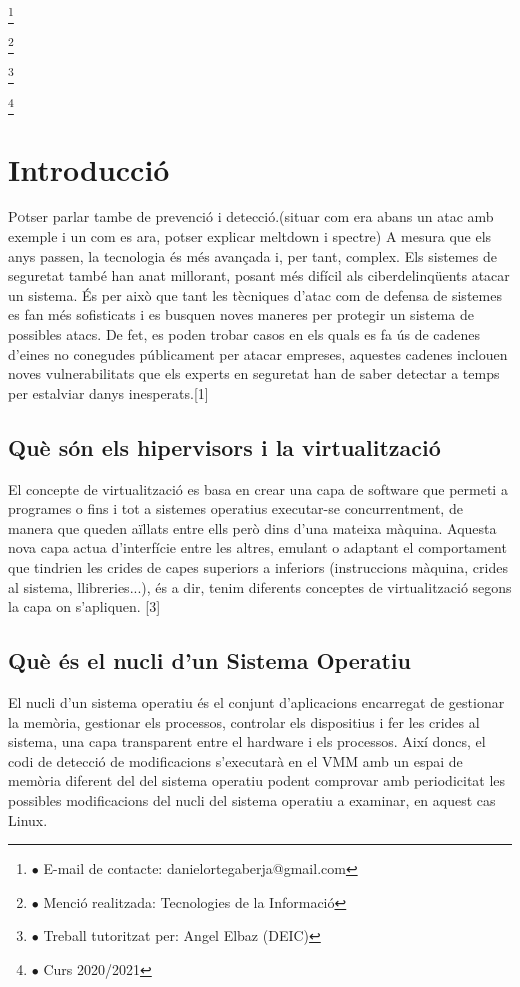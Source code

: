﻿\documentclass[10pt,a4paper,twocolumn,twoside]{article}
\newcommand\blfootnote[1]{%
  \begingroup
  \renewcommand\thefootnote{}\footnote{#1}%
  \addtocounter{footnote}{-1}%
  \endgroup
}
\begin{document}
\blfootnote{$\bullet$ E-mail de contacte: danielortegaberja@gmail.com}
\blfootnote{$\bullet$ Menció realitzada: Tecnologies de la Informació}
\blfootnote{$\bullet$ Treball tutoritzat per: Angel Elbaz (DEIC)}
\blfootnote{$\bullet$ Curs 2020/2021}
\section{Introducció}
\lettrine[lines=3]{P}otser parlar tambe de prevenció i detecció.(situar com era abans un atac amb exemple i un com es ara, potser explicar meltdown i spectre)
A mesura que els anys passen, la tecnologia és més avançada i, per tant, complex. Els sistemes de seguretat també han anat millorant, posant més difícil als ciberdelinqüents atacar un sistema. És per això que tant les tècniques d’atac com de defensa de sistemes es fan més sofisticats i es busquen noves maneres per protegir un sistema de possibles atacs. De fet, es poden trobar casos en els quals es fa ús de cadenes d’eines no conegudes públicament per atacar empreses, aquestes cadenes inclouen noves vulnerabilitats que els experts en seguretat han de saber detectar a temps per estalviar danys inesperats.[1]
\subsection{Què són els hipervisors i la virtualització}
El concepte de virtualització es basa en crear una capa de software que permeti a programes o fins i tot a sistemes operatius executar-se concurrentment, de manera que queden aïllats entre ells però dins d’una mateixa màquina.
Aquesta nova capa actua d’interfície entre les altres, emulant o adaptant el comportament que tindrien les crides de capes superiors a inferiors (instruccions màquina, crides al sistema, llibreries...), és a dir, tenim diferents conceptes de virtualització segons la capa on s’apliquen. [3]

\subsection{Què és el nucli d'un Sistema Operatiu}
El nucli d’un sistema operatiu és el conjunt d’aplicacions encarregat de gestionar la memòria, gestionar els processos, controlar els dispositius i fer les crides al sistema, una capa transparent entre el hardware i els processos.
Així doncs, el codi de detecció de modificacions s’executarà en el VMM amb un espai de memòria diferent del del sistema operatiu podent comprovar amb periodicitat les possibles modificacions del nucli del sistema operatiu a examinar, en aquest cas Linux.
\end{document}
